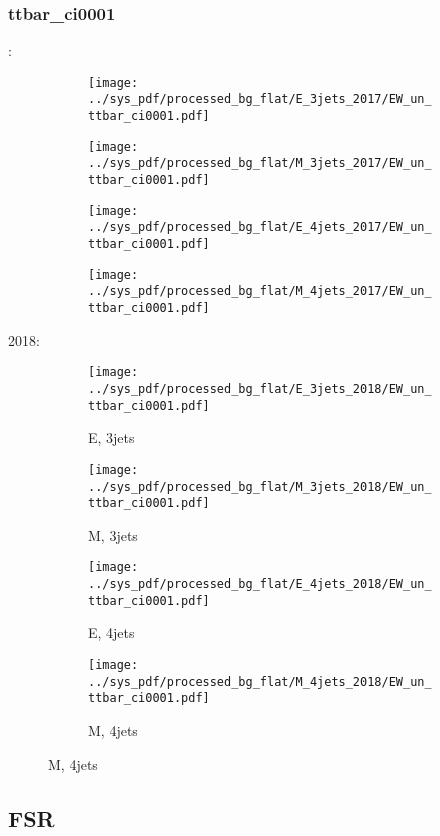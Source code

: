 \documentclass{beamer}
\begin{document}
\begin{frame}
\frametitle{ttbar_ci0001}
\fontsize{5}{1}:
\begin{figure}
\centering
\begin{subfigure}[b]{0.24\textwidth}
\texttt{[image: ../sys\_pdf/processed\_bg\_flat/E\_3jets\_2017/EW\_un\_ttbar\_ci0001.pdf]}
\end{subfigure}
\begin{subfigure}[b]{0.24\textwidth}
\texttt{[image: ../sys\_pdf/processed\_bg\_flat/M\_3jets\_2017/EW\_un\_ttbar\_ci0001.pdf]}
\end{subfigure}
\begin{subfigure}[b]{0.24\textwidth}
\texttt{[image: ../sys\_pdf/processed\_bg\_flat/E\_4jets\_2017/EW\_un\_ttbar\_ci0001.pdf]}
\end{subfigure}
\begin{subfigure}[b]{0.24\textwidth}
\texttt{[image: ../sys\_pdf/processed\_bg\_flat/M\_4jets\_2017/EW\_un\_ttbar\_ci0001.pdf]}
\end{subfigure}
\end{figure}
2018:
\begin{figure}
\centering
\begin{subfigure}[b]{0.24\textwidth}
\texttt{[image: ../sys\_pdf/processed\_bg\_flat/E\_3jets\_2018/EW\_un\_ttbar\_ci0001.pdf]}
\captionsetup{font=tiny}
\caption{E, 3jets}
\end{subfigure}
\begin{subfigure}[b]{0.24\textwidth}
\texttt{[image: ../sys\_pdf/processed\_bg\_flat/M\_3jets\_2018/EW\_un\_ttbar\_ci0001.pdf]}
\captionsetup{font=tiny}
\caption{M, 3jets}
\end{subfigure}
\begin{subfigure}[b]{0.24\textwidth}
\texttt{[image: ../sys\_pdf/processed\_bg\_flat/E\_4jets\_2018/EW\_un\_ttbar\_ci0001.pdf]}
\captionsetup{font=tiny}
\caption{E, 4jets}
\end{subfigure}
\begin{subfigure}[b]{0.24\textwidth}
\texttt{[image: ../sys\_pdf/processed\_bg\_flat/M\_4jets\_2018/EW\_un\_ttbar\_ci0001.pdf]}
\captionsetup{font=tiny}
\caption{M, 4jets}
\end{subfigure}
\end{figure}
\end{frame}


\subsection{FSR}
\end{document}
